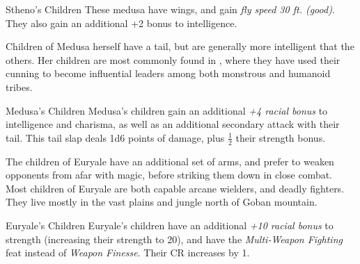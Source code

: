 \begin{35e}{Stheno's Children}
  These medusa have wings, and gain \emph{fly speed 30 ft. (good)}. They also
  gain an additional +2 bonus to intelligence.
\end{35e}

Children of Medusa herself have a tail, but are generally more intelligent
that the others. Her children are most commonly found in ,
where they have used their cunning to become influential leaders among both
monstrous and humanoid tribes.

\begin{35e}{Medusa's Children}
  Medusa's children gain an additional \emph{+4 racial bonus} to intelligence
  and charisma, as well as an additional secondary attack with their tail.
  This tail slap deals 1d6 points of damage, plus $ \frac{1}{2} $ their strength
  bonus.
\end{35e}

The children of Euryale have an additional set of arms, and prefer to weaken
opponents from afar with magic, before striking them down in close combat.
Most children of Euryale are both capable arcane wielders, and deadly
fighters. They live mostly in the vast plains and jungle north of Goban
mountain.

\begin{35e}{Euryale's Children}
  Euryale's children have an additional \emph{+10 racial bonus} to strength
  (increasing their strength to 20), and have the \emph{Multi-Weapon Fighting}
  feat instead of \emph{Weapon Finesse}. Their CR increases by 1.
\end{35e}
